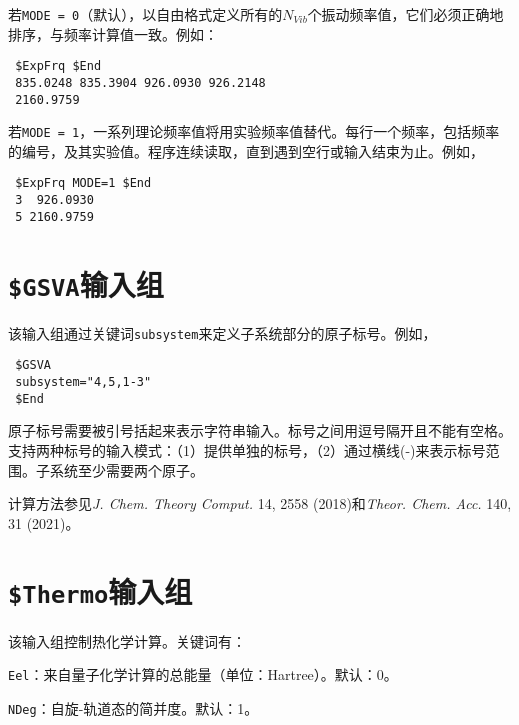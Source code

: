 \documentclass[12pt,a4paper,openany,twoside,cap,UTF8]{ctexbook}
\begin{document}
\bigskip{}\noindent
若\verb|MODE = 0|（默认），以自由格式定义所有的$N_{Vib}$个振动频率值，它们必须正确地排序，与频率计算值一致。例如：
\begin{colorboxed}[oval=false,boxcolor=blue!75!black,bgcolor=blue!5!white]
\ttfamily
\begin{lstlisting}
 $ExpFrq $End
 835.0248 835.3904 926.0930 926.2148
 2160.9759
\end{lstlisting}\end{colorboxed}

\noindent
若\verb|MODE = 1|，一系列理论频率值将用实验频率值替代。每行一个频率，包括频率的编号，及其实验值。程序连续读取，直到遇到空行或输入结束为止。例如，
\begin{colorboxed}[oval=false,boxcolor=blue!75!black,bgcolor=blue!5!white]
\ttfamily
\begin{lstlisting}
 $ExpFrq MODE=1 $End
 3  926.0930
 5 2160.9759
\end{lstlisting}\end{colorboxed}


\section{\texttt{\$GSVA}输入组} \label{sec:inp-gsva}

该输入组通过关键词\verb|subsystem|来定义子系统部分的原子标号。例如，
\begin{colorboxed}[oval=false,boxcolor=blue!75!black,bgcolor=blue!5!white]
\ttfamily
\begin{lstlisting}
 $GSVA
 subsystem="4,5,1-3"
 $End
\end{lstlisting}\end{colorboxed}

原子标号需要被引号括起来表示字符串输入。标号之间用逗号隔开且不能有空格。支持两种标号的输入模式：（1）提供单独的标号，（2）通过横线(-)来表示标号范围。子系统至少需要两个原子。

计算方法参见\textit{J. Chem. Theory Comput.} 14, 2558 (2018)和\textit{Theor. Chem. Acc.} 140, 31 (2021)。

\section{\texttt{\$Thermo}输入组} \label{sec:inp-thermo}

该输入组控制热化学计算。关键词有：

\bigskip{}\noindent
\verb|Eel|：来自量子化学计算的总能量（单位：Hartree）。默认：0。

\bigskip{}\noindent
\verb|NDeg|：自旋-轨道态的简并度。默认：1。
\end{document}
